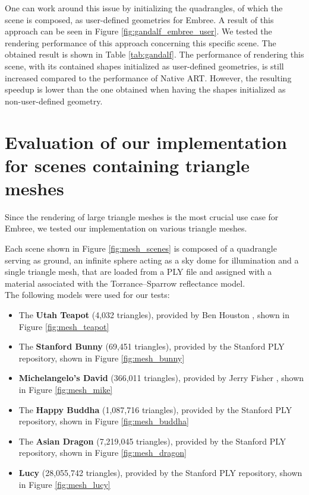 One can work around this issue by initializing the quadrangles, of which the scene is composed, as user-defined geometries for Embree. A result of this approach can be seen in Figure \ref{fig:gandalf_embree_user}. We tested the rendering performance of this approach concerning this specific scene. The obtained result is shown in Table \ref{tab:gandalf}. The performance of rendering this scene, with its contained shapes initialized as user-defined geometries, is still increased compared to the performance of Native ART. However, the resulting speedup is lower than the one obtained when having the shapes initialized as non-user-defined geometry.


\section{Evaluation of our implementation for scenes containing triangle meshes}
\label{sec:result_meshes}

Since the rendering of large triangle meshes is the most crucial use case for Embree, we tested our implementation on various triangle meshes.

Each scene shown in Figure \ref{fig:mesh_scenes} is composed of a quadrangle serving as ground, an infinite sphere acting as a sky dome for illumination and a single triangle mesh, that are loaded from a PLY file and assigned with a material associated with the Torrance–Sparrow reflectance model.
\\

\noindent The following models were used for our tests:
\begin{itemize}
	\setlength\itemsep{0.05em}
	
	\item The \textbf{Utah Teapot} (4,032 triangles), provided by Ben Houston \cite{teapot}, shown in Figure \ref{fig:mesh_teapot}
	\item The \textbf{Stanford Bunny} (69,451 triangles), provided by the Stanford PLY repository, shown in Figure \ref{fig:mesh_bunny}
	\item \textbf{Michelangelo's David} (366,011 triangles), provided by Jerry Fisher \cite{david}, shown in Figure \ref{fig:mesh_mike}
	\item The \textbf{Happy Buddha} (1,087,716 triangles), provided by the Stanford PLY repository, shown in Figure \ref{fig:mesh_buddha}
	\item The \textbf{Asian Dragon} (7,219,045 triangles), provided by the Stanford PLY repository, shown in Figure \ref{fig:mesh_dragon}
	\item \textbf{Lucy} (28,055,742 triangles), provided by the Stanford PLY repository, shown in Figure \ref{fig:mesh_lucy}
\end{itemize}


